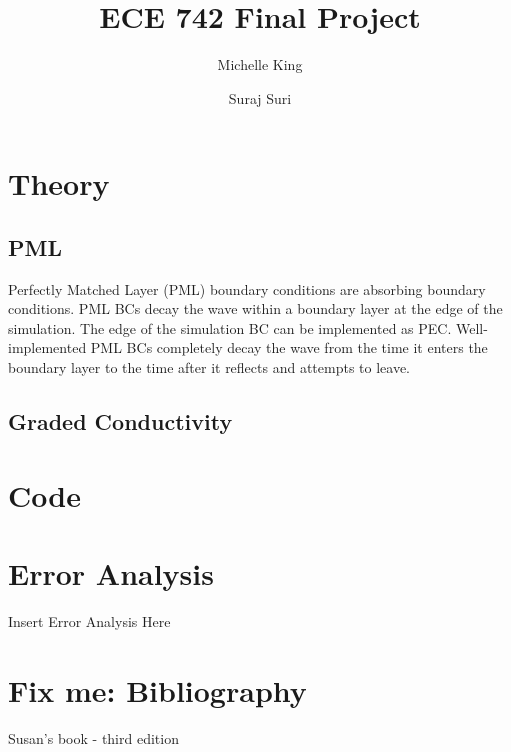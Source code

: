 \documentclass{article}
\title{ECE 742 Final Project}
\author{
  Michelle King
  \and
  Suraj Suri
  }
\begin{document}
\maketitle
\section{Theory}
\subsection{PML}
Perfectly Matched Layer (PML) boundary conditions are absorbing boundary conditions. PML BCs decay the wave within a boundary layer at the edge of the simulation. The edge of the simulation BC can be implemented as PEC. Well-implemented PML BCs completely decay the wave from the time it enters the boundary layer to the time after it reflects and attempts to leave.

\subsection{Graded Conductivity}



\section{Code}


\section{Error Analysis}
Insert Error Analysis Here

\section{Fix me: Bibliography}
Susan's book - third edition
\end{document}
